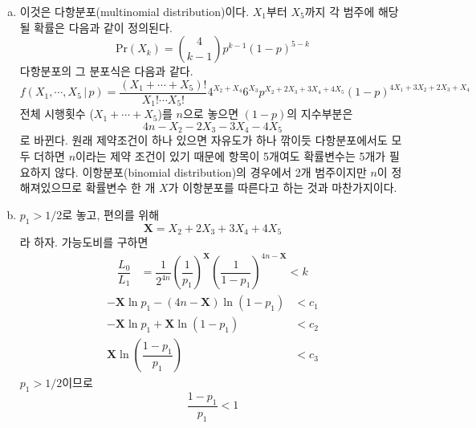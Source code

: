 \documentclass[answers]{exam}
\begin{document}
\begin{questions}
   \begin{solution}
    \begin{enumerate}[(a)]
      \item 이것은 다항분포(multinomial distribution)이다. $X_{1}$부터 $X_{5}$까지 각 범주에 해당될 확률은 다음과 같이 정의된다.
      \begin{equation}
        \mathrm{Pr}\left(X_{k}\right) = {{4}\choose{k-1}}p^{k-1}\left(1-p\right)^{5-k}
      \end{equation}
      다항분포의 그 분포식은 다음과 같다.
      \begin{equation}
        f\left(X_{1},\cdots,X_{5}\,|\,p\right) = \dfrac{\left(X_{1}+\cdots +X_{5}\right)!}{X_{1}!\cdots X_{5}!} 4^{X_{2}+X_{4}}6^{X_{3}}p^{X_{2}+2X_{3}+3X_{4}+4X_{5}}\left(1-p\right)^{4X_{1}+3X_{2}+2X_{3}+X_{4}}
      \end{equation}
      전체 시행횟수 ($X_{1}+\cdots+X_{5}$)를 $n$으로 놓으면 $\left(1-p\right)$의 지수부분은
      \begin{equation}
        4n-X_{2}-2X_{3}-3X_{4}-4X_{5}
      \end{equation}
      로 바뀐다. 원래 제약조건이 하나 있으면 자유도가 하나 깎이듯 다항분포에서도 모두 더하면 $n$이라는 제약 조건이 있기 때문에 항목이 5개여도 확률변수는 5개가 필요하지 않다. 이항분포(binomial distribution)의 경우에서 2개 범주이지만 $n$이 정해져있으므로 확률변수 한 개 $X$가 이항분포를 따른다고 하는 것과 마찬가지이다.
      \item $p_{1}>1/2$로 놓고, 편의를 위해
      \begin{equation}
        \mathbf{X}=X_{2}+2X_{3}+3X_{4}+4X_{5}
      \end{equation}
      라 하자. 가능도비를 구하면
      \begin{align}
        \dfrac{L_{0}}{L_{1}} &= \dfrac{1}{2^{4n}}\left(\dfrac{1}{p_{1}}\right)^{\mathbf{X}}\left(\dfrac{1}{1-p_{1}}\right)^{4n-\mathbf{X}} < k
      \end{align}
      \begin{align}
        -\mathbf{X}\ln p_{1}-\left(4n-\mathbf{X}\right)\ln \left(1-p_{1}\right) &< c_{1}\\
        -\mathbf{X}\ln p_{1}+\mathbf{X}\ln \left(1-p_{1}\right) &< c_{2}\\
        \mathbf{X}\ln\left(\dfrac{1-p_{1}}{p_{1}}\right) &< c_{3}
      \end{align}
      $p_{1}>1/2$이므로
      \begin{equation}
        \dfrac{1-p_{1}}{p_{1}} < 1
      \end{equation}

\end{enumerate}
\end{solution}
\end{questions}
\end{document}
